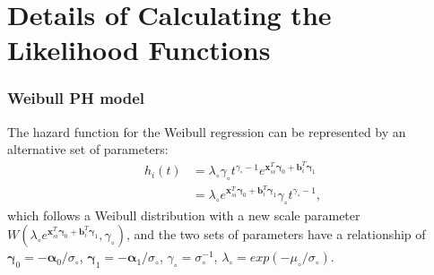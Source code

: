 \section{Details of Calculating the Likelihood Functions}
\label{sec:appenA}




\subsubsection*{Weibull PH model}


The hazard function for the Weibull regression can be represented by an alternative set of parameters:
\begin{equation}
    \begin{split}
        h_i(t) &= \lambda_{\circ}\gamma_{\circ}t^{\gamma_{\circ}-1} e^{\boldsymbol{x}_{si}^T \boldsymbol{\gamma}_0 + \boldsymbol{b}_i^T  \boldsymbol{\gamma}_1} \\
        &= \lambda_{\circ}e^{\boldsymbol{x}_{si}^T \boldsymbol{\gamma}_0 + \boldsymbol{b}_i^T  \boldsymbol{\gamma}_1}  \gamma_{\circ}t^{\gamma_{\circ}-1},
    \end{split}
\end{equation}
which follows a Weibull distribution with a new scale parameter $ W(\lambda_{\circ}e^{\boldsymbol{x}_{si}^T \boldsymbol{\gamma}_0 + \boldsymbol{b}_i^T  \boldsymbol{\gamma}_1}, \gamma_{\circ})$, and the two sets of parameters have a relationship of $\boldsymbol{\gamma}_0 = - \boldsymbol{\alpha}_0 / \sigma_{\circ}$, $\boldsymbol{\gamma}_1 = - \boldsymbol{\alpha}_1/ \sigma_{\circ}$, $\gamma_{\circ} = \sigma_{\circ}^{-1}$, $\lambda_{\circ} = exp(-\mu_{\circ} / \sigma_{\circ})$.


